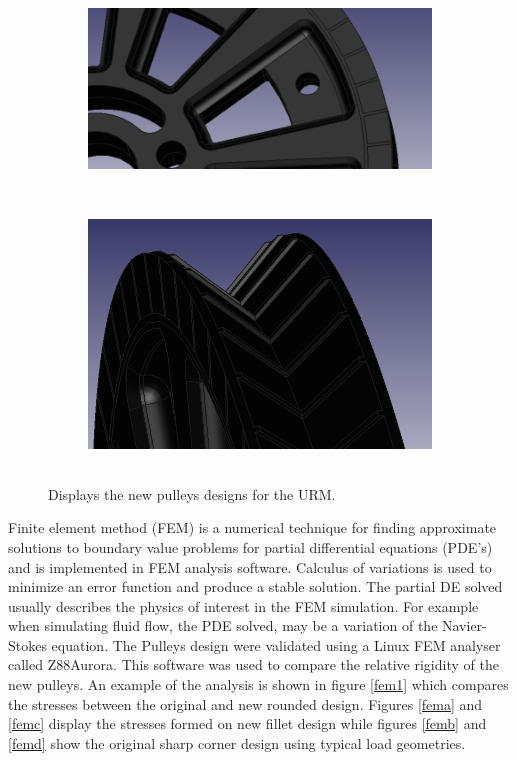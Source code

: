 \documentclass[paper=a4, fontsize=11pt]{scrartcl}
\numberwithin{equation}{section}		%
\numberwithin{figure}{section}			%
\numberwithin{table}{section}				%
\begin{document}
\begin{figure}[h]
        \centering
        \begin{subfigure}[h]{0.8\textwidth}
                \includegraphics[height=5cm]{pull2}
                \caption{}
				\label{pul3}
        \end{subfigure}%
       \quad
        \begin{subfigure}[h]{0.8\textwidth}
                \includegraphics[height=7cm]{pull3}
                \caption{}
                \label{pul2}
        \end{subfigure}
        \quad

        \caption{Displays the new pulleys designs for the URM.}
        \label{pul1}
\end{figure}
Finite element method (FEM) is a numerical technique for finding approximate solutions to boundary value problems for partial differential equations (PDE's) and is implemented in FEM analysis software. Calculus of variations is used to minimize an error function and produce a stable solution. The partial DE solved usually describes the physics of interest in the FEM simulation. For example when simulating fluid flow, the PDE solved, may be a variation of the Navier-Stokes equation.
The Pulleys design were validated using a Linux FEM analyser called Z88Aurora. This software was used to compare the relative rigidity of the new pulleys. An example of the analysis is shown in figure \ref{fem1} which compares the stresses between the original and new rounded design. Figures \ref{fema} and \ref{femc} display the stresses formed on new fillet design while figures \ref{femb} and \ref{femd} show the original sharp corner design using typical load geometries.
\end{document}
